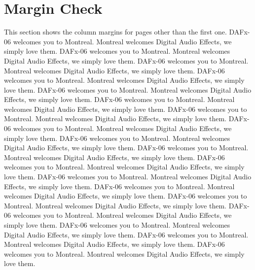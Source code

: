 \documentclass[twoside]{article}
\begin{document}
\section{Margin Check}
This section shows the column margins for pages other than the first one. \bigskip\newline
DAFx-06 welcomes you to Montreal. Montreal welcomes Digital Audio Effects, we simply love them. 
DAFx-06 welcomes you to Montreal. Montreal welcomes Digital Audio Effects, we simply love them. 
DAFx-06 welcomes you to Montreal. Montreal welcomes Digital Audio Effects, we simply love them. 
DAFx-06 welcomes you to Montreal. Montreal welcomes Digital Audio Effects, we simply love them. 
DAFx-06 welcomes you to Montreal. Montreal welcomes Digital Audio Effects, we simply love them. 
DAFx-06 welcomes you to Montreal. Montreal welcomes Digital Audio Effects, we simply love them. 
DAFx-06 welcomes you to Montreal. Montreal welcomes Digital Audio Effects, we simply love them. 
DAFx-06 welcomes you to Montreal. Montreal welcomes Digital Audio Effects, we simply love them. 
DAFx-06 welcomes you to Montreal. Montreal welcomes Digital Audio Effects, we simply love them. 
DAFx-06 welcomes you to Montreal. Montreal welcomes Digital Audio Effects, we simply love them. 
DAFx-06 welcomes you to Montreal. Montreal welcomes Digital Audio Effects, we simply love them. 
DAFx-06 welcomes you to Montreal. Montreal welcomes Digital Audio Effects, we simply love them. 
DAFx-06 welcomes you to Montreal. Montreal welcomes Digital Audio Effects, we simply love them. 
DAFx-06 welcomes you to Montreal. Montreal welcomes Digital Audio Effects, we simply love them. 
DAFx-06 welcomes you to Montreal. Montreal welcomes Digital Audio Effects, we simply love them. 
DAFx-06 welcomes you to Montreal. Montreal welcomes Digital Audio Effects, we simply love them. 
DAFx-06 welcomes you to Montreal. Montreal welcomes Digital Audio Effects, we simply love them. 
DAFx-06 welcomes you to Montreal. Montreal welcomes Digital Audio Effects, we simply love them. 
\end{document}
